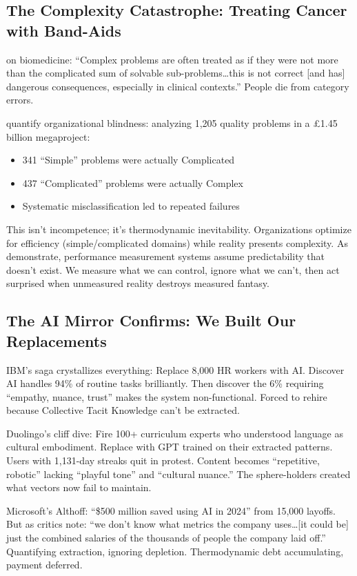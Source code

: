 \subsection{The Complexity Catastrophe: Treating Cancer with Band-Aids}

\citet{kempermann2017} on biomedicine: ``Complex problems are often treated as if they were not more than the complicated sum of solvable sub-problems\ldots this is not correct [and has] dangerous consequences, especially in clinical contexts.'' People die from category errors.

\citet{ford2024} quantify organizational blindness: analyzing 1,205 quality problems in a £1.45 billion megaproject:
\begin{itemize}
\item 341 ``Simple'' problems were actually Complicated
\item 437 ``Complicated'' problems were actually Complex
\item Systematic misclassification led to repeated failures
\end{itemize}

This isn't incompetence; it's thermodynamic inevitability. Organizations optimize for efficiency (simple/complicated domains) while reality presents complexity. As \citet{alexander2018} demonstrate, performance measurement systems assume predictability that doesn't exist. We measure what we can control, ignore what we can't, then act surprised when unmeasured reality destroys measured fantasy.

\subsection{The AI Mirror Confirms: We Built Our Replacements}

IBM's saga crystallizes everything: Replace 8,000 HR workers with AI. Discover AI handles 94\% of routine tasks brilliantly. Then discover the 6\% requiring ``empathy, nuance, trust'' makes the system non-functional. Forced to rehire because \citet{collins2010} Collective Tacit Knowledge can't be extracted.

Duolingo's cliff dive: Fire 100+ curriculum experts who understood language as cultural embodiment. Replace with GPT trained on their extracted patterns. Users with 1,131-day streaks quit in protest. Content becomes ``repetitive, robotic'' lacking ``playful tone'' and ``cultural nuance.'' The sphere-holders created what vectors now fail to maintain.

Microsoft's Althoff: ``\$500 million saved using AI in 2024'' from 15,000 layoffs. But as critics note: ``we don't know what metrics the company uses\ldots [it could be] just the combined salaries of the thousands of people the company laid off.'' Quantifying extraction, ignoring depletion. Thermodynamic debt accumulating, payment deferred.

